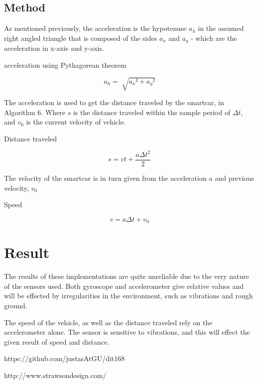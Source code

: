\documentclass[12pt]{article}
\begin{document}
\subsection{Method}
As mentioned previously, the acceleration is the hypotenuse $a_h$ in the assumed right angled triangle that is composed of the sides $a_x$ and $a_y$ - which are the acceleration in x-axis and y-axis. 
\begin{algorithm}                 
    \caption{acceleration using Pythagorean theorem}    
		\[a_h = \sqrt[]{{a_x² + a_y²}}\]
\end{algorithm}
The acceleration is used to get the distance traveled by the smartcar, in Algorithm 6. Where $s$ is the distance traveled within the sample period of $\Delta t$, and $v_0$ is the current velocity of vehicle. 
\begin{algorithm}                 
    \caption{Distance traveled}    
		\[ s = vt+\frac{a\Delta t ^2}{2}\]
\end{algorithm}

The velocity of the smartcar is in turn given from the acceleration $a$ and previous velocity, $v_0$

\begin{algorithm}                 
    \caption{Speed}    
		\[ v = a\Delta t + v_0\]
\end{algorithm}


\section{Result}
The results of these implementations are quite unreliable due to the very nature of the sensors used. Both gyroscope and accelerometer give relative values and will be effected by irregularities in the environment, such as vibrations and rough ground. 

The speed of the vehicle, as well as the distance traveled rely on the accelerometer alone. The sensor is sensitive to vibrations, and this will effect the given result of speed and distance.    

\begin{thebibliography}{9}
https://github.com/justasAtGU/dit168

http://www.strawsondesign.com/

\end{thebibliography}
 
\end{document}
